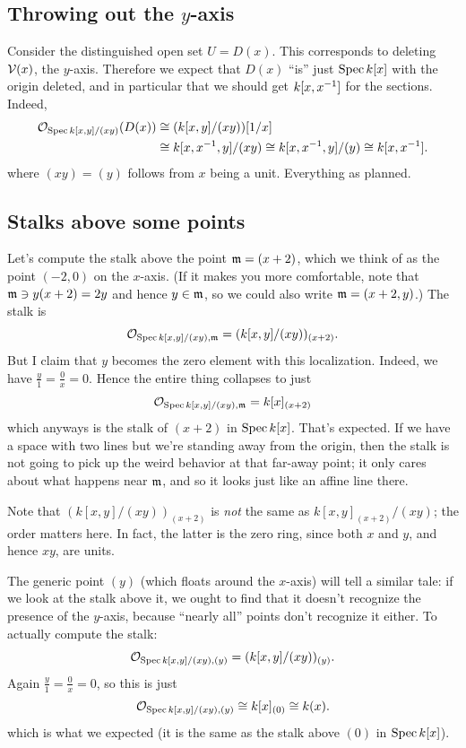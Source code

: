 \subsection{Throwing out the $y$-axis}
Consider the distinguished open set $U = D(x)$.
This corresponds to deleting $\mathcal V(x)$, the $y$-axis.
Therefore we expect that $D(x)$
``is'' just $\operatorname{Spec} k[x]$ with the origin deleted,
and in particular that we should get $k[x, x^{-1}]$
for the sections.
Indeed,
\begin{align*}
	\mathcal O_{\operatorname{Spec} k[x,y]/(xy)} (D(x))
	&\cong (k[x,y]/(xy))[1/x] \\
	&\cong k[x, x^{-1}, y] / (xy) \cong k[x, x^{-1}, y] / (y) \cong k[x, x^{-1}].
\end{align*}
where $(xy) = (y)$ follows from $x$ being a unit.
Everything as planned.

\subsection{Stalks above some points}
Let's compute the stalk above the point $\mathfrak m = (x+2)$,
which we think of as the point $(-2,0)$ on the $x$-axis.
(If it makes you more comfortable, note that $\mathfrak m \ni y(x+2) = 2y$
and hence $y \in \mathfrak m$, so we could also write $\mathfrak m = (x+2,y)$.)
The stalk is
\[ \mathcal O_{\operatorname{Spec} k[x,y] / (xy), \mathfrak m} = (k[x,y]/ (xy))_{(x+2)}. \]
But I claim that $y$ becomes the zero element with this localization.
Indeed, we have $\frac y1 = \frac 0x = 0$.
Hence the entire thing collapses to just
\[ \mathcal O_{\operatorname{Spec} k[x,y] / (xy), \mathfrak m} = k[x]_{(x+2)} \]
which anyways is the stalk of $(x+2)$ in $\operatorname{Spec} k[x]$.
That's expected.
If we have a space with two lines but we're
standing away from the origin,
then the stalk is not going to pick up the weird behavior
at that far-away point;
it only cares about what happens near $\mathfrak m$,
and so it looks just like an affine line there.

\begin{remark}
	Note that $(k[x,y]/ (xy))_{(x+2)}$
	is \emph{not} the same as $k[x,y]_{(x+2)} / (xy)$;
	the order matters here.
	In fact, the latter is the zero ring,
	since both $x$ and $y$, and hence $xy$, are units.
\end{remark}

The generic point $(y)$ (which floats around the $x$-axis)
will tell a similar tale:
if we look at the stalk above it,
we ought to find that it doesn't recognize the presence of the $y$-axis,
because ``nearly all'' points don't recognize it either.
To actually compute the stalk:
\[ \mathcal O_{\operatorname{Spec} k[x,y] / (xy), (y)} = (k[x,y]/ (xy))_{(y)}. \]
Again $\frac y1 = \frac 0x = 0$, so this is just
\[ \mathcal O_{\operatorname{Spec} k[x,y] / (xy), (y)} \cong k[x]_{(0)} \cong k(x). \]
which is what we expected
(it is the same as the stalk above $(0)$ in $\operatorname{Spec} k[x]$).

